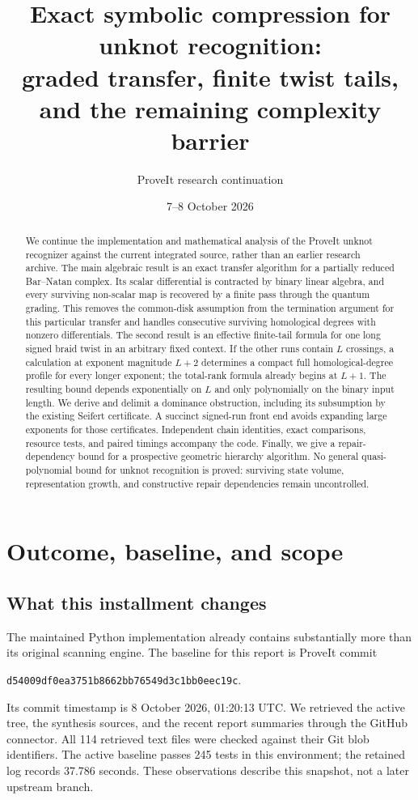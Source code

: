 \documentclass[11pt]{article}
\title{Exact symbolic compression for unknot recognition:\\
graded transfer, finite twist tails, and the remaining complexity barrier}
\author{ProveIt research continuation}
\date{7--8 October 2026}
\theoremstyle{definition}
\theoremstyle{remark}
\newcommand{\code}[1]{\texttt{#1}}
\begin{document}
\maketitle
\begin{abstract}
We continue the implementation and mathematical analysis of the ProveIt unknot recognizer against the current integrated source, rather than an earlier research archive. The main algebraic result is an exact transfer algorithm for a partially reduced Bar--Natan complex. Its scalar differential is contracted by binary linear algebra, and every surviving non-scalar map is recovered by a finite pass through the quantum grading. This removes the common-disk assumption from the termination argument for this particular transfer and handles consecutive surviving homological degrees with nonzero differentials. The second result is an effective finite-tail formula for one long signed braid twist in an arbitrary fixed context. If the other runs contain $L$ crossings, a calculation at exponent magnitude $L+2$ determines a compact full homological-degree profile for every longer exponent; the total-rank formula already begins at $L+1$. The resulting bound depends exponentially on $L$ and only polynomially on the binary input length. We derive and delimit a dominance obstruction, including its subsumption by the existing Seifert certificate. A succinct signed-run front end avoids expanding large exponents for those certificates. Independent chain identities, exact comparisons, resource tests, and paired timings accompany the code. Finally, we give a repair-dependency bound for a prospective geometric hierarchy algorithm. No general quasi-polynomial bound for unknot recognition is proved: surviving state volume, representation growth, and constructive repair dependencies remain uncontrolled.
\end{abstract}

\clearpage
\tableofcontents
\newpage

\section{Outcome, baseline, and scope}
\label{sec:scope}

\subsection{What this installment changes}
The maintained Python implementation already contains substantially more than its original scanning engine. The baseline for this report is ProveIt commit
\begin{center}
\code{d54009df0ea3751b8662bb76549d3c1bb0eec19c}.
\end{center}
Its commit timestamp is 8 October 2026, 01:20:13 UTC. We retrieved the active  tree, the synthesis sources, and the recent report summaries through the GitHub connector. All 114 retrieved text files were checked against their Git blob identifiers. The active baseline passes 245 tests in this environment; the retained log records 37.786 seconds. These observations describe this snapshot, not a later upstream branch.
\end{document}
